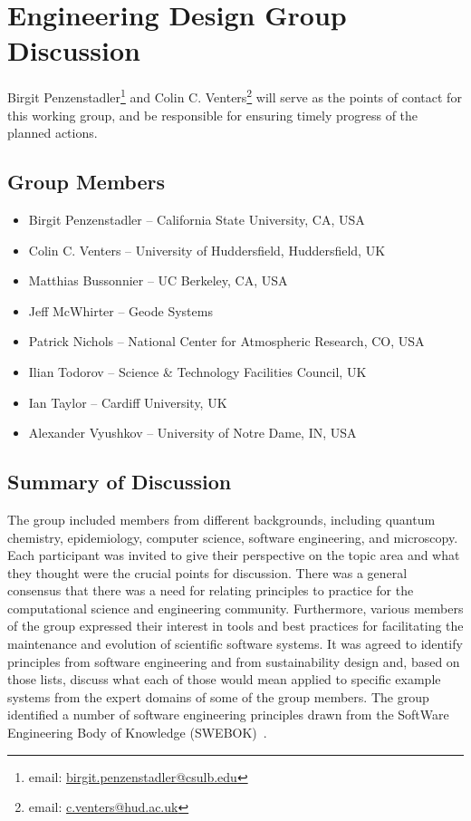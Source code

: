 \section{Engineering Design Group Discussion}
\label{sec:appendix_eng_design}

Birgit Penzenstadler\footnote{email: \href{mailto:birgit.penzenstadler@csulb.edu}{birgit.penzenstadler@csulb.edu}} and Colin C. Venters\footnote{email: \href{mailto:c.venters@hud.ac.uk}{c.venters@hud.ac.uk}} will serve as the points of contact for this working group, and be responsible for ensuring timely progress of the planned actions.

\subsection{Group Members}

\begin{itemize}
\item Birgit Penzenstadler -- California State University, CA, USA
\item Colin C. Venters -- University of Huddersfield, Huddersfield, UK
\item Matthias Bussonnier -- UC Berkeley, CA, USA
\item Jeff McWhirter -- Geode Systems 
\item Patrick Nichols -- National Center for Atmospheric Research, CO, USA
\item Ilian Todorov -- Science \& Technology Facilities Council, UK
\item Ian Taylor -- Cardiff University, UK
\item Alexander Vyushkov -- University of Notre Dame, IN, USA
\end{itemize}

\subsection{Summary of Discussion}

The group included members from different backgrounds, including quantum chemistry, epidemiology, computer science, software engineering, and microscopy. Each participant was invited to give their perspective on the topic area and what they thought were the crucial points for discussion. There was a general consensus that there was a need for relating principles to practice for the computational science and engineering community. Furthermore, various members of the group expressed their interest in tools and best practices for facilitating the maintenance and evolution of scientific software systems. It was agreed to identify principles from software engineering and from sustainability design and, based on those lists, discuss what each of those would mean applied to specific example systems from the expert domains of some of the group members. The group identified a number of software engineering principles drawn from the SoftWare Engineering Body of Knowledge (SWEBOK)~\cite{swebokv3}. 

